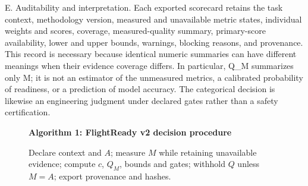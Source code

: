 \documentclass[conference]{IEEEtran}
\begin{document}
E. Auditability and interpretation. Each exported scorecard retains the task context, methodology version, measured and unavailable metric states, individual weights and scores, coverage, measured-quality summary, primary-score availability, lower and upper bounds, warnings, blocking reasons, and provenance. This record is necessary because identical numeric summaries can have different meanings when their evidence coverage differs. In particular, Q\_M summarizes only M; it is not an estimator of the unmeasured metrics, a calibrated probability of readiness, or a prediction of model accuracy. The categorical decision is likewise an engineering judgment under declared gates rather than a safety certification.
\begin{figure}[t]\small\textbf{Algorithm 1: FlightReady v2 decision procedure}\par Declare context and $A$; measure $M$ while retaining unavailable evidence; compute $c$, $Q_M$, bounds and gates; withhold $Q$ unless $M=A$; export provenance and hashes.\end{figure}
\end{document}
